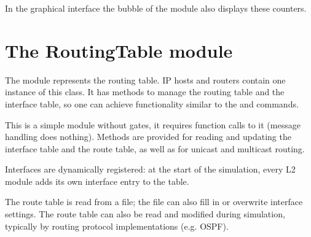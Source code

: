 In the graphical interface the bubble of the  module
also displays these counters.


\section{The RoutingTable module}

The  module represents the routing table.
IP hosts and routers contain one instance of this class. It has
methods to manage the routing table and the interface table,
so one can achieve functionality similar to the  and
 commands.

This is a simple module without gates, it requires function calls to it
(message handling does nothing). Methods are provided for reading and
updating the interface table and the route table, as well as for unicast
and multicast routing.

Interfaces are dynamically registered: at the start of the simulation,
every L2 module adds its own interface entry to the table.

The route table is read from a file; the file can
also fill in or overwrite interface settings. The route table can also
be read and modified during simulation, typically by routing protocol
implementations (e.g. OSPF).

